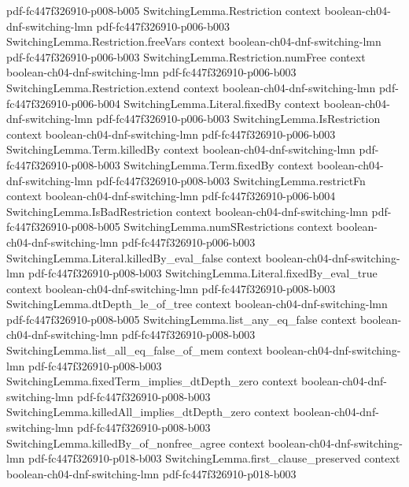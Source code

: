 \begin{theorem}
  {pdf-fc447f326910-p008-b005}
\proofstep
  {SwitchingLemma.Restriction}
  {context}
  {boolean-ch04-dnf-switching-lmn}
  {pdf-fc447f326910-p006-b003}
\proofstep
  {SwitchingLemma.Restriction.freeVars}
  {context}
  {boolean-ch04-dnf-switching-lmn}
  {pdf-fc447f326910-p006-b003}
\proofstep
  {SwitchingLemma.Restriction.numFree}
  {context}
  {boolean-ch04-dnf-switching-lmn}
  {pdf-fc447f326910-p006-b003}
\proofstep
  {SwitchingLemma.Restriction.extend}
  {context}
  {boolean-ch04-dnf-switching-lmn}
  {pdf-fc447f326910-p006-b004}
\proofstep
  {SwitchingLemma.Literal.fixedBy}
  {context}
  {boolean-ch04-dnf-switching-lmn}
  {pdf-fc447f326910-p006-b003}
\proofstep
  {SwitchingLemma.IsRestriction}
  {context}
  {boolean-ch04-dnf-switching-lmn}
  {pdf-fc447f326910-p006-b003}
\proofstep
  {SwitchingLemma.Term.killedBy}
  {context}
  {boolean-ch04-dnf-switching-lmn}
  {pdf-fc447f326910-p008-b003}
\proofstep
  {SwitchingLemma.Term.fixedBy}
  {context}
  {boolean-ch04-dnf-switching-lmn}
  {pdf-fc447f326910-p008-b003}
\proofstep
  {SwitchingLemma.restrictFn}
  {context}
  {boolean-ch04-dnf-switching-lmn}
  {pdf-fc447f326910-p006-b004}
\proofstep
  {SwitchingLemma.IsBadRestriction}
  {context}
  {boolean-ch04-dnf-switching-lmn}
  {pdf-fc447f326910-p008-b005}
\proofstep
  {SwitchingLemma.numSRestrictions}
  {context}
  {boolean-ch04-dnf-switching-lmn}
  {pdf-fc447f326910-p006-b003}
\proofstep
  {SwitchingLemma.Literal.killedBy_eval_false}
  {context}
  {boolean-ch04-dnf-switching-lmn}
  {pdf-fc447f326910-p008-b003}
\proofstep
  {SwitchingLemma.Literal.fixedBy_eval_true}
  {context}
  {boolean-ch04-dnf-switching-lmn}
  {pdf-fc447f326910-p008-b003}
\proofstep
  {SwitchingLemma.dtDepth_le_of_tree}
  {context}
  {boolean-ch04-dnf-switching-lmn}
  {pdf-fc447f326910-p008-b005}
\proofstep
  {SwitchingLemma.list_any_eq_false}
  {context}
  {boolean-ch04-dnf-switching-lmn}
  {pdf-fc447f326910-p008-b003}
\proofstep
  {SwitchingLemma.list_all_eq_false_of_mem}
  {context}
  {boolean-ch04-dnf-switching-lmn}
  {pdf-fc447f326910-p008-b003}
\proofstep
  {SwitchingLemma.fixedTerm_implies_dtDepth_zero}
  {context}
  {boolean-ch04-dnf-switching-lmn}
  {pdf-fc447f326910-p008-b003}
\proofstep
  {SwitchingLemma.killedAll_implies_dtDepth_zero}
  {context}
  {boolean-ch04-dnf-switching-lmn}
  {pdf-fc447f326910-p008-b003}
\proofstep
  {SwitchingLemma.killedBy_of_nonfree_agree}
  {context}
  {boolean-ch04-dnf-switching-lmn}
  {pdf-fc447f326910-p018-b003}
\proofstep
  {SwitchingLemma.first_clause_preserved}
  {context}
  {boolean-ch04-dnf-switching-lmn}
  {pdf-fc447f326910-p018-b003}
\proofstep

\end{theorem}
